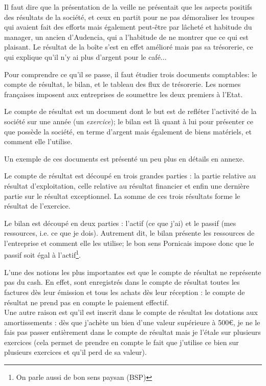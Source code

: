 Il faut dire que la présentation de la veille ne présentait 
que les aspects positifs des résultats de la société, et 
ceux en partit pour ne pas démoraliser les troupes qui avaient 
fait des efforts mais également peut-être par lâcheté et 
habitude du manager, un ancien d'Audencia, qui a l'habitude de 
ne montrer que ce qui est plaisant. 
Le résultat de la boîte s'est en effet amélioré mais pas sa 
trésorerie, ce qui explique qu'il n'y ai plus d'argent pour 
le café... 

Pour comprendre ce qu'il se passe, il faut étudier trois 
documents comptables: le compte de résultat, le bilan, et le 
tableau des flux de trésorerie. 
Les normes françaises imposent aux entreprises de soumettre 
les deux premiers à l'Etat.

Le compte de résultat est un document dont le but est de 
refléter l'activité de la société sur une année (un \emph{exercice});
le bilan est là quant à lui pour 
présenter ce que possède la société, en terme d'argent mais 
également de biens matériels, et comment elle l'utilise.

Un exemple de ces documents est présenté un peu plus en détails en annexe.

Le compte de résultat est découpé en trois grandes parties : 
la partie relative au résultat d'exploitation, celle relative 
au résultat financier et enfin une dernière partie sur le 
résultat exceptionnel. La somme de ces trois résultats forme 
le résultat de l'exercice.

Le bilan est découpé en deux parties : l'actif (ce que j'ai) 
et le passif (mes ressources, i.e. ce que je dois).
Autrement dit, le bilan présente les ressources de l'entreprise 
et comment elle les utilise; le bon sens Pornicais impose donc que 
le passif soit égal à l'actif\footnote{On parle aussi de bon sens paysan (BSP)}.

L'une des notions les plus importantes est que le compte 
de résultat ne représente pas du cash. En effet, sont 
enregistrés dans le compte de résultat toutes les factures dès 
leur émission et tous les achats dès leur réception : le 
compte de résultat ne prend pas en compte le paiement effectif. \\
\hspace*{\parindent}Une autre raison est qu'il est inscrit dans le compte de 
résultat les dotations aux amortissements : dès que j'achète un bien 
d'une valeur supérieure à 500\euro\/, je ne le fais pas passer 
entièrement dans le compte de résultat mais je l'étale sur 
plusieurs exercices (cela permet de prendre en compte le fait 
que j'utilise ce bien sur plusieurs exercices et qu'il perd de sa 
valeur).

